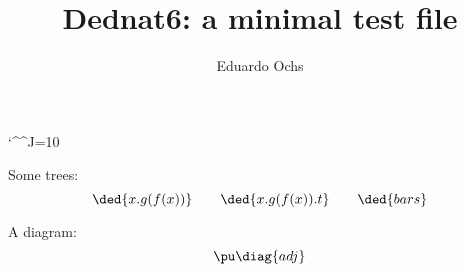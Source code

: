 \documentclass[oneside]{article}
\begin{document}
  \catcode`\^^J=10                      %


\title{Dednat6: a minimal test file}
\author{Eduardo Ochs}
\maketitle

Some trees:
%
%
\pu
$$\ded{x.g(f(x))} \qquad \ded{x.g(f(x)).t} \qquad \ded{bars}$$




\def\catA{\mathbf{A}}
\def\catB{\mathbf{B}}

A diagram:
%
$$\pu
  \diag{adj}
$$
\end{document}
